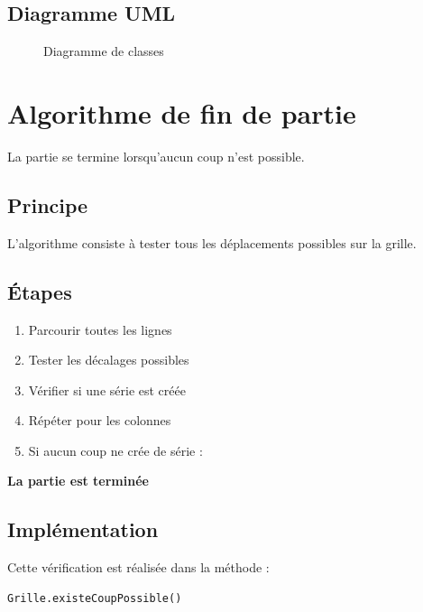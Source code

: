 \documentclass[a4paper,12pt]{article}
\begin{document}
\subsection{Diagramme UML}

\begin{figure}[h]
    \centering
    \caption{Diagramme de classes}
\end{figure}

\section{Algorithme de fin de partie}

La partie se termine lorsqu’aucun coup n’est possible.

\subsection{Principe}

L’algorithme consiste à tester tous les déplacements possibles sur la grille.

\subsection{Étapes}

\begin{enumerate}
    \item Parcourir toutes les lignes
    \item Tester les décalages possibles
    \item Vérifier si une série est créée
    \item Répéter pour les colonnes
    \item Si aucun coup ne crée de série :
\end{enumerate}

\begin{center}
\textbf{La partie est terminée}
\end{center}

\subsection{Implémentation}

Cette vérification est réalisée dans la méthode :

\begin{verbatim}
Grille.existeCoupPossible()
\end{verbatim}
\end{document}
